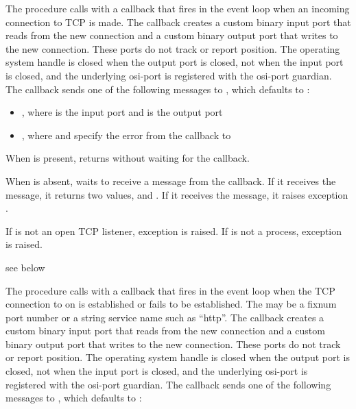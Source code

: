 The  procedure calls  with a
callback that fires in the event loop when an incoming connection to
TCP  is made. The callback creates a
custom binary input port that reads from the new connection and a
custom binary output port that writes to the new connection. These
ports do not track or report position. The operating system handle is
closed when the output port is closed, not when the input port is
closed, and the underlying osi-port is registered with the osi-port
guardian.  The callback sends one of the
following messages to , which defaults to :

\begin{itemize}
\item {}, where
   is the input port and  is the output port

\item {}, where  and  specify the error
  from the callback to 
\end{itemize}

When  is present,  returns
 without waiting for the callback.

When  is absent,  waits to receive a
message from the callback. If it receives the 
message, it returns two values,  and . If it receives
the  message, it raises exception
.

If  is not an open TCP listener, exception
 is raised.  If
 is not a process, exception  is raised.

\begin{procedure}
\end{procedure}
\returns{} see below

The  procedure calls  with
a callback that fires in the event loop when the TCP connection to
 on  is established or fails to be
established.  The  may be a fixnum port number or a
string service name such as ``http''. The callback creates a custom
binary input port that reads from the new connection and a custom
binary output port that writes to the new connection. These ports do
not track or report position. The operating system handle is closed
when the output port is closed, not when the input port is closed, and
the underlying osi-port is registered with the osi-port
guardian.  The callback sends one of the
following messages to , which defaults to :

